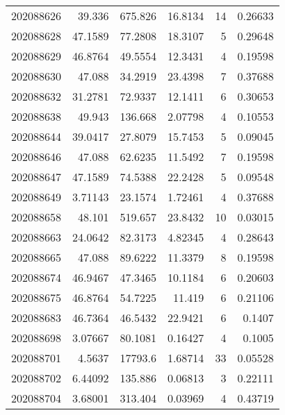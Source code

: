 \begin{tabular}{rrrrrr}
 202088626 &         39.336   &      675.826  &           16.8134  &          14 & 0.26633 \\
 202088628 &         47.1589  &       77.2808 &           18.3107  &           5 & 0.29648 \\
 202088629 &         46.8764  &       49.5554 &           12.3431  &           4 & 0.19598 \\
 202088630 &         47.088   &       34.2919 &           23.4398  &           7 & 0.37688 \\
 202088632 &         31.2781  &       72.9337 &           12.1411  &           6 & 0.30653 \\
 202088638 &         49.943   &      136.668  &            2.07798 &           4 & 0.10553 \\
 202088644 &         39.0417  &       27.8079 &           15.7453  &           5 & 0.09045 \\
 202088646 &         47.088   &       62.6235 &           11.5492  &           7 & 0.19598 \\
 202088647 &         47.1589  &       74.5388 &           22.2428  &           5 & 0.09548 \\
 202088649 &          3.71143 &       23.1574 &            1.72461 &           4 & 0.37688 \\
 202088658 &         48.101   &      519.657  &           23.8432  &          10 & 0.03015 \\
 202088663 &         24.0642  &       82.3173 &            4.82345 &           4 & 0.28643 \\
 202088665 &         47.088   &       89.6222 &           11.3379  &           8 & 0.19598 \\
 202088674 &         46.9467  &       47.3465 &           10.1184  &           6 & 0.20603 \\
 202088675 &         46.8764  &       54.7225 &           11.419   &           6 & 0.21106 \\
 202088683 &         46.7364  &       46.5432 &           22.9421  &           6 & 0.1407  \\
 202088698 &          3.07667 &       80.1081 &            0.16427 &           4 & 0.1005  \\
 202088701 &          4.5637  &    17793.6    &            1.68714 &          33 & 0.05528 \\
 202088702 &          6.44092 &      135.886  &            0.06813 &           3 & 0.22111 \\
 202088704 &          3.68001 &      313.404  &            0.03969 &           4 & 0.43719 \\

\end{tabular}
